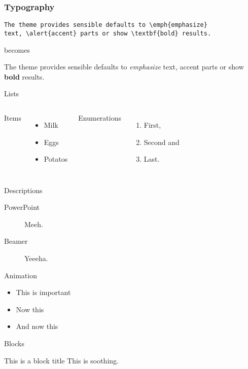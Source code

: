 \documentclass[10pt, compress]{beamer}
\begin{document}
\begin{frame}[fragile]
  \frametitle{Typography}
      \begin{verbatim}
The theme provides sensible defaults to \emph{emphasize}
text, \alert{accent} parts or show \textbf{bold} results.
      \end{verbatim}

  \begin{center}becomes\end{center}

  The theme provides sensible defaults to \emph{emphasize} text,
  \alert{accent} parts or show \textbf{bold} results.
\end{frame}
\begin{frame}{Lists}
  \begin{columns}[onlytextwidth]
      Items
      \begin{itemize}
        \item Milk \item Eggs \item Potatos
      \end{itemize}

      Enumerations
      \begin{enumerate}
        \item First, \item Second and \item Last.
      \end{enumerate}
  \end{columns}
\end{frame}
\begin{frame}{Descriptions}
  \begin{description}
    \item[PowerPoint] Meeh.
    \item[Beamer] Yeeeha.
  \end{description}
\end{frame}
\begin{frame}{Animation}
  \begin{itemize}[<+- | alert@+>]
    \item \alert<4>{This is important}
    \item Now this
    \item And now this
  \end{itemize}
\end{frame}
\begin{frame}{Blocks}

  \begin{block}{This is a block title}
    This is soothing.
  \end{block}

\end{frame}
\end{document}
